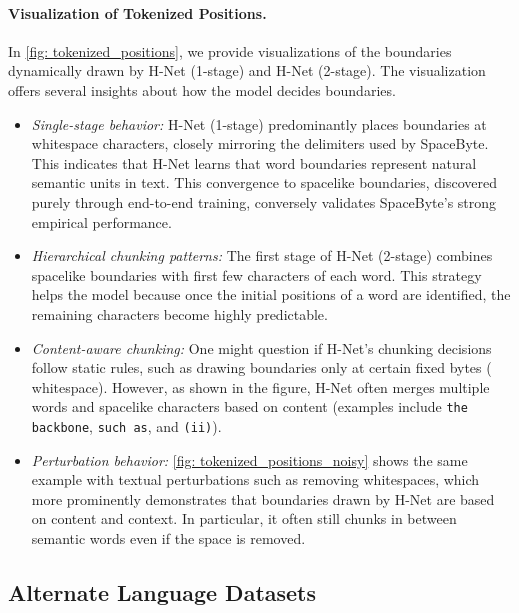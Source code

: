 \paragraph{Visualization of Tokenized Positions.}
\label{sec: analysis}
In \cref{fig: tokenized_positions}, we provide visualizations of the boundaries dynamically drawn by H-Net (1-stage) and H-Net (2-stage).
The visualization offers several insights about how the model decides boundaries.
\begin{itemize}
    \item \textit{Single-stage behavior:} H-Net (1-stage) predominantly places boundaries at whitespace characters, closely mirroring the delimiters used by SpaceByte.
    This indicates that H-Net learns that word boundaries represent natural semantic units in text.
    This convergence to spacelike boundaries, discovered purely through end-to-end training, conversely validates SpaceByte's strong empirical performance.
    \item \textit{Hierarchical chunking patterns:} The first stage of H-Net (2-stage) combines spacelike boundaries with first few characters of each word.
    This strategy helps the model because once the initial positions of a word are identified, the remaining characters become highly predictable.
    \item \textit{Content-aware chunking:}
    One might question if H-Net's chunking decisions follow static rules, such as drawing boundaries only at certain fixed bytes (\eg{} whitespace).
    However, as shown in the figure, H-Net often merges multiple words and spacelike characters based on content (examples include \texttt{the backbone}, \texttt{such as}, and \texttt{(ii)}).
    \item \textit{Perturbation behavior:} 
    \cref{fig: tokenized_positions_noisy} shows the same example with textual perturbations such as removing whitespaces, which more prominently demonstrates that boundaries drawn by H-Net are based on content and context. In particular, it often still chunks in between semantic words even if the space is removed.
\end{itemize}



\subsection{Alternate Language Datasets}

\label{sec: experiments-alt-language}

